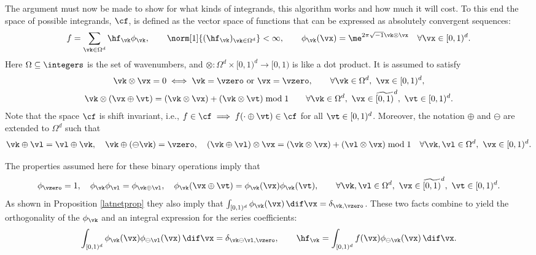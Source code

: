 \documentclass[graybox]{svmult}
\newcommand{\cube}{[0,1)^d}
\newcommand{\tcube}{\widetilde{[0,1)}^d}
\begin{document}
The argument must now be made to show for what kinds of integrands, this algorithm works and how much it will cost.  To this end the space of possible integrands, $\cf$, is defined as the vector space of functions that can be expressed as absolutely convergent sequences:
\[
f = \sum_{\vk \in \Omega^d} \hf_{\vk} \phi_{\vk}, \qquad \norm[1]{(\hf_{\vk})_{\vk \in \Omega^d}}<\infty, \qquad \phi_{\vk}(\vx) = \me^{2 \pi \sqrt{-1} \vk \otimes \vx} \quad \forall \vx \in\cube.
\]
Here $\Omega \subseteq \integers$ is the set of wavenumbers, and $\otimes : \Omega^d \times \cube \to [0,1)$ is like a dot product.  It is assumed to satisfy
\begin{gather*}
\vk \otimes \vx = 0 \iff \vk=\vzero \text{ or } \vx=\vzero, \qquad \forall \vk \in \Omega^d,\ \vx \in \cube,\\
\vk\otimes(\vx \oplus \vt) = (\vk \otimes \vx) + (\vk \otimes \vt) \bmod 1 \qquad \forall \vk \in \Omega^d, \ \vx \in \tcube,\ \vt \in \cube.
\end{gather*}
Note that the space $\cf$ is shift invariant, i.e., $f \in \cf \implies f(\cdot \oplus \vt) \in \cf$ for all $\vt \in \cube$. Moreover, the notation $\oplus$ and $\ominus$ are extended to $\Omega^d$ such that
\[
\vk \oplus \vl = \vl \oplus \vk, \quad \vk \oplus (\ominus \vk) = \vzero, \quad (\vk \oplus \vl) \otimes \vx = (\vk \otimes \vx) +  (\vl \otimes \vx) \bmod 1 \quad \forall \vk, \vl \in \Omega^d,\ \vx \in \cube.
\]

The properties assumed here for these binary operations imply that 
\[
\phi_{\vzero}=1, \quad \phi_{\vk} \phi_{\vl} = \phi_{\vk\oplus\vl}, \quad \phi_{\vk}(\vx \oplus \vt) = \phi_{\vk}(\vx) \phi_{\vk}(\vt), \qquad \forall \vk,\vl \in \Omega^d,\ \vx \in \tcube, \ \vt \in \cube. 
\]
As shown in Proposition \ref{latnetprop} they also imply that $\int_{\cube} \phi_{\vk}(\vx) \, \dif \vx = \delta_{\vk, \vzero}$.  These two facts combine to yield the orthogonality of the $\phi_{\vk}$ and an integral expression for the series coefficients:
\[
\int_{\cube} \phi_{\vk}(\vx) \phi_{\ominus \vl}(\vx) \, \dif \vx = \delta_{\vk \ominus \vl, \vzero}, \qquad \hf_{\vk} = \int_{\cube} f(\vx) \phi_{\ominus \vk}(\vx) \, \dif \vx.
\]
\end{document}
